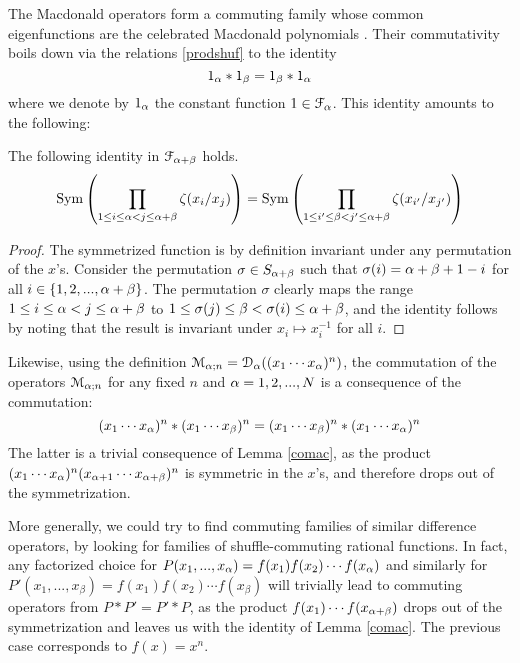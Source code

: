 The Macdonald operators form a commuting family whose common eigenfunctions 
are the celebrated Macdonald polynomials \cite{macdo}.
Their commutativity boils down via the relations \eqref{prodshuf} to the identity
$$1_{\alpha}*1_\beta=1_\beta*1_{\alpha}$$
where we denote by $1_{\alpha}$ the constant function $1\in {\mathcal F}_{\alpha}$.
This identity amounts to the following:
\begin{lemma}\label{comac}
The following identity in ${\mathcal F}_{{\alpha}+\beta}$ holds.
\begin{equation}
{\rm Sym}\left(\prod_{1\leq i\leq {\alpha}<j\leq {\alpha}+\beta} \zeta(x_i/x_j)\right)=
{\rm Sym}\left(\prod_{1\leq i'\leq \beta<j'\leq {\alpha}+\beta} \zeta(x_{i'}/x_{j'})\right)
\end{equation}
\end{lemma}
\begin{proof}
The symmetrized function is by definition invariant under any permutation of the $x$'s. 
Consider the permutation $\sigma\in S_{{\alpha}+\beta}$ such that $\sigma(i)={\alpha}+\beta+1-i$
for all $i\in \{1,2,...,{\alpha}+\beta\}$.
The permutation $\sigma$ clearly maps the range $1\leq i\leq {\alpha}<j\leq {\alpha}+\beta$ to
$1\leq \sigma(j)\leq \beta< \sigma(i)\leq {\alpha}+\beta$, and the identity follows by noting that
the result is invariant under $x_i\mapsto x_i^{-1}$ for all $i$.
\end{proof}

Likewise, using the definition ${\mathcal M}_{{\alpha};n}={\mathcal D}_{\alpha}((x_1\cdots x_{\alpha})^n)$,
the commutation of the operators ${\mathcal M}_{{\alpha};n}$ for any fixed $n$ and ${\alpha}=1,2,...,N$
is a consequence of the commutation:
$$(x_1\cdots x_{\alpha})^n * (x_1\cdots x_\beta)^n =(x_1\cdots x_\beta)^n * (x_1\cdots x_{\alpha})^n $$
The latter is a trivial consequence of Lemma  \ref{comac}, as the product
$(x_1\cdots x_{\alpha})^n (x_{{\alpha}+1}\cdots x_{{\alpha}+\beta})^n$ is symmetric in the $x$'s, and therefore 
drops out of the symmetrization.

More generally, we could try to find commuting families of similar difference operators, by looking
for families of shuffle-commuting rational functions. In fact, any factorized choice for
$P(x_1,...,x_{\alpha})=f(x_1)f(x_2)\cdots f(x_{\alpha})$ and similarly for $P'(x_1,...,x_\beta)=f(x_1)f(x_2)\cdots f(x_\beta)$
will trivially lead to commuting operators from $P*P'=P'*P$,
as the product $f(x_1)\cdots f(x_{{\alpha}+\beta})$ drops out of the 
symmetrization and leaves us with the identity of Lemma \ref{comac}. 
The previous case corresponds to $f(x)=x^n$. 

